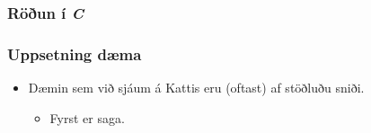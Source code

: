 \documentclass{beamer}
\newcommand\env[2]
{
	\begin{#1}
	#2
	\end{#1}
}
\newcommand\code[1]{\tiny}
\begin{document}
\env{frame}
{
	\frametitle{Röðun í \emph{C}}
	\code{sort.c}
}

\env{frame}
{
	\frametitle{Uppsetning dæma}
	\env{itemize}
	{
		\item<1-> Dæmin sem við sjáum á Kattis eru (oftast) af stöðluðu sniði.
		\env{itemize}
		{
			\item<2-> Fyrst er saga.
		}
	}
}
\end{document}
